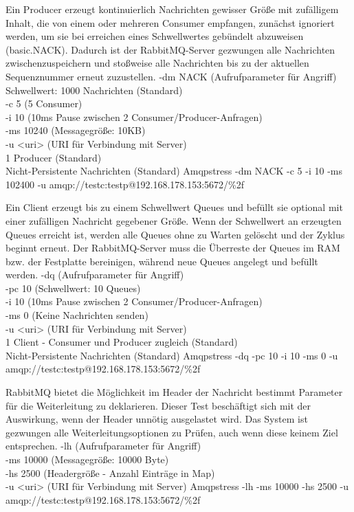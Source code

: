 \documentclass[	a4paper,
			11pt,
			titlepage,
			oneside,
			fleqn,
			listof=totoc,
			parskip,
			numbers=noenddot]{scrartcl}
\begin{document}
	
	
		{%
		 Ein Producer erzeugt kontinuierlich Nachrichten gewisser Größe mit zufälligem Inhalt, die von einem oder mehreren Consumer empfangen, zunächst ignoriert werden, um sie bei erreichen eines Schwellwertes gebündelt abzuweisen (basic.NACK). Dadurch ist der RabbitMQ-Server gezwungen alle Nachrichten zwischenzuspeichern und stoßweise alle Nachrichten bis zu der aktuellen Sequenznummer erneut zuzustellen.
		}{%
		 -dm NACK (Aufrufparameter für Angriff) \\
		 Schwellwert: 1000 Nachrichten (Standard) \\
		 -c 5 (5 Consumer) \\
		 -i 10 (10ms Pause zwischen 2 Consumer/Producer-Anfragen) \\
		 -ms 10240 (Messagegröße: 10KB) \\
		 -u <uri> (URI für Verbindung mit Server) \\
		 1 Producer (Standard) \\
		 Nicht-Persistente Nachrichten (Standard)
		}{%
		 Amqpstress -dm NACK -c 5 -i 10 -ms 102400 -u amqp://testc:testp@192.168.178.153:5672/\%2f
		}
		

		{%
		 Ein Client erzeugt bis zu einem Schwellwert Queues und befüllt sie optional mit einer zufälligen Nachricht gegebener Größe. Wenn der Schwellwert an erzeugten Queues erreicht ist, werden alle Queues ohne zu Warten gelöscht und der Zyklus beginnt erneut. Der RabbitMQ-Server muss die Überreste der Queues im RAM bzw. der Festplatte bereinigen, während neue Queues angelegt und befüllt werden.
		}{%
		 -dq (Aufrufparameter für Angriff) \\
		 -pc 10 (Schwellwert: 10 Queues) \\
		 -i 10 (10ms Pause zwischen 2 Consumer/Producer-Anfragen) \\
		 -ms 0 (Keine Nachrichten senden) \\
		 -u <uri> (URI für Verbindung mit Server) \\
		 1 Client - Consumer und Producer zugleich (Standard) \\
		 Nicht-Persistente Nachrichten (Standard)
		}{%
		 Amqpstress -dq -pc 10 -i 10 -ms 0 -u amqp://testc:testp@192.168.178.153:5672/\%2f
		}
		
		
		
		{%
		 RabbitMQ bietet die Möglichkeit im Header der Nachricht bestimmt Parameter für die Weiterleitung zu deklarieren. Dieser Test beschäftigt sich mit der Auswirkung, wenn der Header unnötig ausgelastet wird. Das System ist gezwungen alle Weiterleitungsoptionen zu Prüfen, auch wenn diese keinem Ziel entsprechen.
		}{%
		 -lh (Aufrufparameter für Angriff) \\
		 -ms 10000 (Messagegröße: 10000 Byte) \\
		 -hs 2500 (Headergröße - Anzahl Einträge in Map) \\
		 -u <uri> (URI für Verbindung mit Server)
		}{%
		 Amqpstress -lh -ms 10000 -hs 2500 -u amqp://testc:testp@192.168.178.153:5672/\%2f
		}
\end{document}
